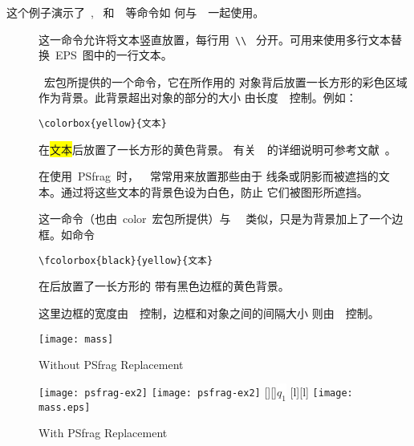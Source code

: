 这个例子演示了~, ~和~~等命令如
何与~~一起使用。

\begin{description}
\item[] 这一命令允许将文本竖直放置，每行用~\verb+\\+~
     分开。可用来使用多行文本替换~EPS~图中的一行文本。
\item[] ~宏包所提供的一个命令，它在所作用的
     对象背后放置一长方形的彩色区域作为背景。此背景超出对象的部分的大小
     由长度~~控制。例如：
     \begin{Verbatim}[formatcom=\color{VerbatimColor}\CJKfamily{kai}]
         \colorbox{yellow}{文本}
     \end{Verbatim}
     在{\colorbox{yellow}{文本}}后放置了一长方形的黄色背景。
     有关~~的详细说明可参考文献~\cite{grfguide}。

     在使用~\textsf{PSfrag}~时，~~常常用来放置那些由于
     线条或阴影而被遮挡的文本。通过将这些文本的背景色设为白色，防止
     它们被图形所遮挡。
\item[] 这一命令（也由~\textsf{color}~宏包所提供）与
     ~~类似，只是为背景加上了一个边框。如命令
     \begin{Verbatim}[formatcom=\color{VerbatimColor}\CJKfamily{kai}]
         \fcolorbox{black}{yellow}{文本}
     \end{Verbatim}
     在{}后放置了一长方形的
    带有黑色边框的黄色背景。

     这里边框的宽度由~~控制，边框和对象之间的间隔大小
     则由~~控制。
\end{description}

\begin{figure}
\hspace{-1.5cm}
\begin{minipage}[b]{.7\textwidth}
\centering
\texttt{[image: mass]}
\caption{Without PSfrag Replacement}\label{fig:nopsfragex1}
\par\vspace{0pt}
\end{minipage}%
\hspace{-3cm}
\begin{minipage}[b]{.7\textwidth}
\ifpdf
\centering
\texttt{[image: psfrag-ex2]}
\else
\ifdvipdfm
\centering
\texttt{[image: psfrag-ex2]}
\else
{}[][]{\colorbox{white}{$q_1$}}
[l][l]{}
\centering
\texttt{[image: mass.eps]}
\fi
\fi
\caption{With PSfrag Replacement}\label{fig:psfragex2}
\par\vspace{0pt}
\end{minipage}
\end{figure}

